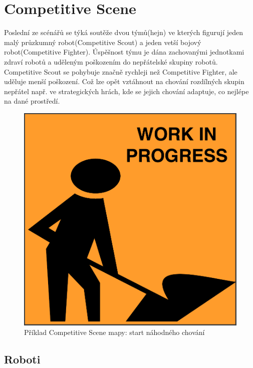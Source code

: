 \section{Competitive Scene}
Poslední ze scénářů se týká soutěže dvou týmů(hejn) ve kterých figurují jeden malý průzkumný robot(Competitive Scout) a jeden vetší bojový robot(Competitive Fighter). Úspěšnost týmu je dána zachovanými jednotkami zdraví robotů a uděleným poškozením do nepřátelské skupiny robotů. Competitive Scout se pohybuje značně rychleji než Competitive Fighter, ale uděluje menší poškození. Což lze opět vztáhnout na chování rozdílných skupin nepřátel např. ve strategických hrách, kde se jejich chování adaptuje, co nejlépe na dané prostředí. 

\clearpage

\begin{figure}[p]\centering
	\includegraphics[width=\columnwidth]{../img/todo}
	\caption{Příklad Competitive Scene mapy: start náhodného chování}
	\label{obr04:CompetitiveSceneRandomStart}
\end{figure}
\clearpage 

\subsection{Roboti}

